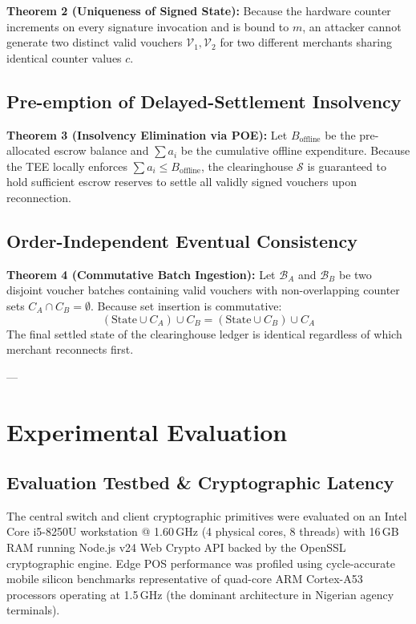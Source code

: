 \documentclass[conference]{IEEEtran}
\begin{document}
\textbf{Theorem 2 (Uniqueness of Signed State):} Because the hardware counter increments on every signature invocation and is bound to $m$, an attacker cannot generate two distinct valid vouchers $\mathcal{V}_1, \mathcal{V}_2$ for two different merchants sharing identical counter values $c$.

\subsection{Pre-emption of Delayed-Settlement Insolvency}
\textbf{Theorem 3 (Insolvency Elimination via POE):} Let $B_{\text{offline}}$ be the pre-allocated escrow balance and $\sum a_i$ be the cumulative offline expenditure. Because the TEE locally enforces $\sum a_i \le B_{\text{offline}}$, the clearinghouse $\mathcal{S}$ is guaranteed to hold sufficient escrow reserves to settle all validly signed vouchers upon reconnection.

\subsection{Order-Independent Eventual Consistency}
\textbf{Theorem 4 (Commutative Batch Ingestion):} Let $\mathcal{B}_A$ and $\mathcal{B}_B$ be two disjoint voucher batches containing valid vouchers with non-overlapping counter sets $C_A \cap C_B = \emptyset$. Because set insertion is commutative:
\begin{equation}
(\text{State} \cup C_A) \cup C_B = (\text{State} \cup C_B) \cup C_A
\end{equation}
The final settled state of the clearinghouse ledger is identical regardless of which merchant reconnects first.

---

\section{Experimental Evaluation}

\subsection{Evaluation Testbed \& Cryptographic Latency}
The central switch and client cryptographic primitives were evaluated on an Intel Core i5-8250U workstation @ 1.60\,GHz (4 physical cores, 8 threads) with 16\,GB RAM running Node.js v24 Web Crypto API backed by the OpenSSL cryptographic engine. Edge POS performance was profiled using cycle-accurate mobile silicon benchmarks representative of quad-core ARM Cortex-A53 processors operating at 1.5\,GHz (the dominant architecture in Nigerian agency terminals).
\end{document}
